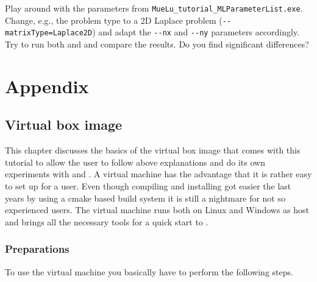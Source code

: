 \documentclass[10pt,fleqn]{book}
\begin{document}
\begin{exercise}
Play around with the parameters from \verb|MueLu_tutorial_MLParameterList.exe|. Change, e.g., the problem type to a 2D Laplace problem (\verb|--matrixType=Laplace2D|) and adapt the \verb|--nx| and \verb|--ny| parameters accordingly.
Try to run both \ml and \muelu and compare the results. Do you find significant differences?
\end{exercise}

\appendix
\part{Appendix}

\chapter{Virtual box image}

This chapter discusses the basics of the virtual box image that comes with this tutorial to allow the user to follow above explanations and do its own experiments with \muelu and \trilinos. A virtual machine has the advantage that it is rather easy to set up for a user. Even though compiling and installing got easier the last years by using a cmake based build system it is still a nightmare for not so experienced users. The virtual machine runs both on Linux and Windows as host and brings all the necessary tools for a quick start to \muelu.

\section{Preparations}

To use the virtual machine you basically have to perform the following steps.
\end{document}

